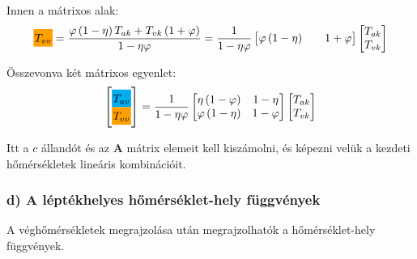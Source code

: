 Innen a mátrixos alak:
\begin{equation}
	\highlight{orange!75!yellow}{T_{vv}}
	=
	\dfrac{
		\varphi \left( 1 - \eta \right) T_{ak} + T_{vk} \left( 1 + \varphi \right)
	}{
		1 - \eta \varphi
	}
	=
	\dfrac{1}{1-\eta \varphi}
	\begin{bmatrix}
		\varphi \left( 1 - \eta \right) && 1 + \varphi
	\end{bmatrix}
	\begin{bmatrix}
		T_{ak} \\
		T_{vk}
	\end{bmatrix}
\end{equation}

Összevonva két mátrixos egyenlet:
\begin{equation}
	\label{equation:K71TM}
	\begin{bmatrix}
		\highlight{cyan}{T_{av}} \\
		\highlight{orange!75!yellow}{T_{vv}}
	\end{bmatrix}
	=
	\dfrac{1}{1 - \eta \varphi}
	\begin{bmatrix}
		\eta\left(1-\varphi\right) & 1-\eta \\
		\varphi\left(1-\eta\right) & 1-\varphi
	\end{bmatrix}
	\begin{bmatrix}
		T_{ak} \\
		T_{vk}
	\end{bmatrix}
\end{equation}

Itt a $c$ állandót és az $\mathbf{A}$ mátrix elemeit kell kiszámolni, és képezni velük a kezdeti hőmérsékletek lineáris kombinációit. 

\subsubsection*{d) A léptékhelyes hőmérséklet-hely függvények}
A véghőmérsékletek megrajzolása után megrajzolhatók a hőmérséklet-hely függvények.

